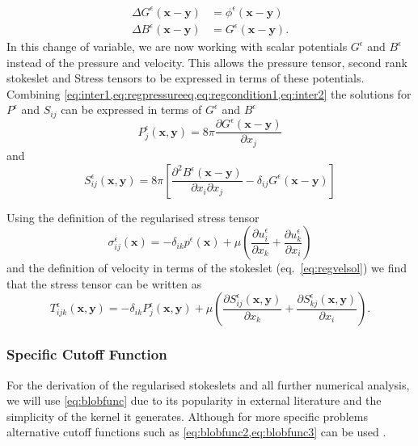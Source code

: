 \begin{subequations}
\label{eq:intermediate}
\begin{align}
    \Delta G^\epsilon(\bm{x}-\bm{y})  &= \phi^\epsilon(\bm{x}-\bm{y}) \label{eq:inter1} \\
    \Delta B^\epsilon(\bm{x}-\bm{y})  &= G^\epsilon(\bm{x}-\bm{y}). \label{eq:inter2}
\end{align}
\end{subequations}
In this change of variable, we are now working with scalar potentials $G^\epsilon$ and $B^\epsilon$ instead of the pressure and velocity. This allows the pressure tensor, second rank stokeslet and Stress tensors to be expressed in terms of these potentials. Combining \cref{eq:inter1,eq:regpressureeq,eq:regcondition1,eq:inter2} the solutions for $P^\epsilon$ and $S_{ij}$ can be expressed in terms of $G^\epsilon$ and $B^\epsilon$
\begin{equation}
\label{eq:pressuresol}
    P^\epsilon_{j}(\bm{x},\bm{y}) = 8 \pi \frac{\partial G^\epsilon(\bm{x}-\bm{y})}{\partial x_j}
\end{equation}
and
\begin{equation}
\label{eq:regstokeslet1}
    S_{ij}^\epsilon(\bm{x}, \bm{y}) = 8\pi\left[ \frac{\partial^2 B^\epsilon(\bm{x} -\bm{y})}{\partial x_i \partial x_j} - \delta_{ij}  G^\epsilon(\bm{x} -\bm{y})\right]
\end{equation}

Using the definition of the regularised stress tensor 
\begin{equation}
\label{eq:regstress}
    \sigma_{ij}^\epsilon(\bm{x}) = -\delta_{ik}p^\epsilon(\bm{x}) + \mu\left( \frac{\partial u^\epsilon_i}{\partial x_k} + \frac{\partial u^\epsilon_k}{\partial x_i} \right)
\end{equation}
and the definition of velocity in terms of the stokeslet (eq.~\ref{eq:regvelsol}) we find that the stress tensor can be written as 
\begin{equation}
\label{eq:regDoubleLayerSol}
    T^\epsilon_{ijk}(\bm{x},\bm{y}) = -\delta_{ik} P^\epsilon_j(\bm{x},\bm{y}) + \mu\left( \frac{\partial S^\epsilon_{ij}(\bm{x},\bm{y})}{\partial x_k} + \frac{\partial S^\epsilon_{kj}(\bm{x},\bm{y})}{\partial x_i}\right).
\end{equation}

\subsubsection{Specific Cutoff Function}
For the derivation of the regularised stokeslets and all further numerical analysis, we will use \cref{eq:blobfunc} due to its popularity in external literature and the simplicity of the kernel it generates. Although for more specific problems alternative cutoff functions such as \cref{eq:blobfunc2,eq:blobfunc3} can be used \cite{Olson2013ModelingFormulation,Nguyen2014ReductionFlow,Zhao2019}.


